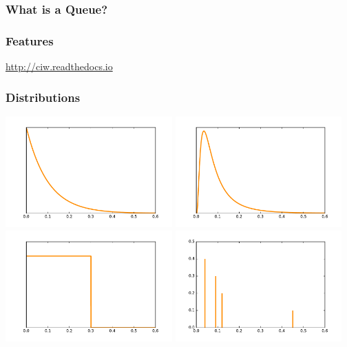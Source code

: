 \documentclass{beamer}
\begin{document}
\begin{frame}
\frametitle{What is a Queue?}
\begin{figure}
  
\end{figure}
\end{frame}


\begin{frame}
\frametitle{Features}
\begin{center}
\textcolor{darkorange}{\url{http://ciw.readthedocs.io}}\\
\end{center}
\end{frame}

\begin{frame}
\frametitle{Distributions}
\includegraphics[width=0.48\textwidth]{expondist.pdf}
\includegraphics[width=0.48\textwidth]{lognormdist.pdf}\\
\includegraphics[width=0.48\textwidth]{uniformdist.pdf}
\includegraphics[width=0.48\textwidth]{custom.pdf}
\end{frame}
\end{document}
